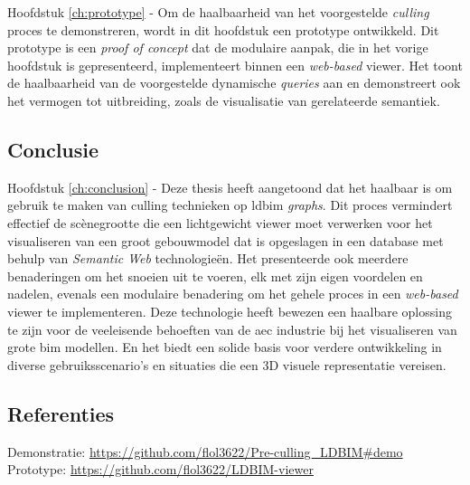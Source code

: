 \begin{refsection}
\begin{multicols}{2}
        \textsf{Hoofdstuk \ref{ch:prototype} -}
        Om de haalbaarheid van het voorgestelde \emph{culling} proces te demonstreren, wordt in dit hoofdstuk een prototype ontwikkeld. Dit prototype is een \emph{proof of concept} dat de modulaire aanpak, die in het vorige hoofdstuk is gepresenteerd, implementeert binnen een \emph{web-based} viewer. Het toont de haalbaarheid van de voorgestelde dynamische \emph{queries} aan en demonstreert ook het vermogen tot uitbreiding, zoals de visualisatie van gerelateerde semantiek.

        \subsection*{Conclusie}
        \textsf{Hoofdstuk \ref{ch:conclusion} -} Deze thesis heeft aangetoond dat het haalbaar is om gebruik te maken van culling technieken op \ac{ldbim} \emph{graphs}. Dit proces vermindert effectief de scènegrootte die een lichtgewicht viewer moet verwerken voor het visualiseren van een groot gebouwmodel dat is opgeslagen in een database met behulp van \emph{Semantic Web} technologieën. Het presenteerde ook meerdere benaderingen om het snoeien uit te voeren, elk met zijn eigen voordelen en nadelen, evenals een modulaire benadering om het gehele proces in een \emph{web-based} viewer te implementeren. Deze technologie heeft bewezen een haalbare oplossing te zijn voor de veeleisende behoeften van de \ac{aec} industrie bij het visualiseren van grote \ac{bim} modellen. En het biedt een solide basis voor verdere ontwikkeling in diverse gebruiksscenario's en situaties die een 3D visuele representatie vereisen.

    \end{multicols}
    \subsection*{Referenties}
    \small
    {\renewcommand*{\bibfont}{\small}
        \printbibliography}

    \textsf{Demonstratie:} \url{https://github.com/flol3622/Pre-culling_LDBIM#demo}\\
    \textsf{Prototype:} \url{https://github.com/flol3622/LDBIM-viewer}
\end{refsection}